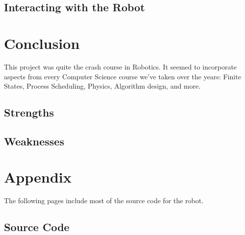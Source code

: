 \documentclass[12pt]{article}
\begin{document}
\subsection{Interacting with the Robot}

\clearpage
\section{Conclusion}
This project was quite the crash course in Robotics.  It seemed to incorporate aspects from every Computer Science course we've taken over the years: Finite States, Process Scheduling, Physics, Algorithm design, and more.


\subsection{Strengths}
\subsection{Weaknesses}

\clearpage
\section{Appendix}
The following pages include most of the source code for the robot.
\subsection{Source Code}
\end{document}
